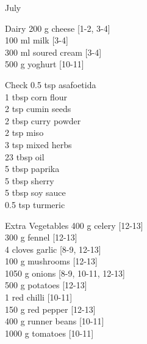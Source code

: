 \begin{menu}{July}
      \begin{shoppinglist}{Dairy}
      200 g cheese {\scriptsize[1-2, 3-4]}\\
      100 ml milk {\scriptsize[3-4]}\\
      300 ml soured cream {\scriptsize[3-4]}\\
      500 g yoghurt {\scriptsize[10-11]}\\
      \end{shoppinglist}%
      \par\vfil %
      \vfil\clearpage %
      \begin{shoppinglist}{Check}
      0.5 tsp asafoetida \\
      1 tbsp corn flour \\
      2 tsp cumin seeds \\
      2 tbsp curry powder \\
      2 tsp miso \\
      3 tsp mixed herbs \\
      23 tbsp oil \\
      5 tbsp paprika \\
      5 tbsp sherry \\
      5 tbsp soy sauce \\
      0.5 tsp turmeric \\
      \end{shoppinglist}%
      \begin{shoppinglist}{Extra Vegetables}
      400 g celery {\scriptsize[12-13]}\\
      300 g fennel {\scriptsize[12-13]}\\
      4 cloves garlic {\scriptsize[8-9, 12-13]}\\
      100 g mushrooms {\scriptsize[12-13]}\\
      1050 g onions {\scriptsize[8-9, 10-11, 12-13]}\\
      500 g potatoes {\scriptsize[12-13]}\\
      1  red chilli {\scriptsize[10-11]}\\
      150 g red pepper {\scriptsize[12-13]}\\
      400 g runner beans {\scriptsize[10-11]}\\
      1000 g tomatoes {\scriptsize[10-11]}\\
      \end{shoppinglist}%
      \par\vfil %
    \vfil\clearpage
  

\end{menu}
